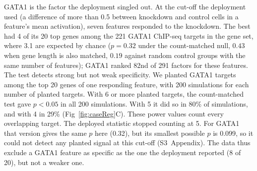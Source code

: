 \documentclass[10pt,letterpaper]{article}
\begin{document}
GATA1 is the factor the deployment singled out. At the cut-off the
deployment used (a difference of more than 0.5 between knockdown and
control cells in a feature's mean activation), seven features responded
to the knockdown. The best had 4 of its 20 top genes among the
221 GATA1 ChIP-seq targets in the gene set, where 3.1 are expected by
chance ($p = 0.32$ under the count-matched null, $0.43$ when gene length
is also matched, $0.19$ against random control groups with the same
number of features); GATA1 ranked 82nd of 291 factors for these
features. The test detects strong but not weak specificity. We planted
GATA1 targets among the top 20 genes of one responding feature, with 200
simulations for each number of planted targets. With 6 or more planted
targets, the count-matched test gave $p < 0.05$ in all 200 simulations.
With 5 it did so in 80\% of simulations, and with 4 in 29\%
(Fig~\ref{fig:caseReg}C). These power values count every overlapping
target. The deployed statistic stopped counting at 5. For GATA1 that
version gives the same $p$ here (0.32), but its smallest possible $p$ is
0.099, so it could not detect any planted signal at this cut-off
(S3~Appendix). The data thus exclude a GATA1 feature as specific as the
one the deployment reported (8 of 20), but not a weaker one.
\end{document}
